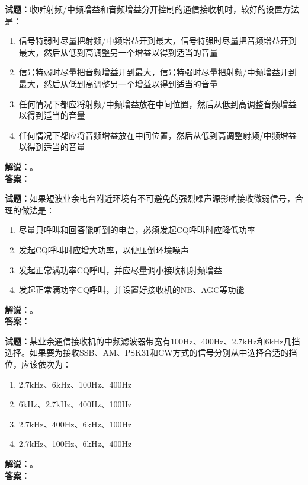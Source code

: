 \documentclass{ctexbook}
\begin{document}
\bigskip

\noindent\textbf{试题：}收听射频/中频增益和音频增益分开控制的通信接收机时，较好的设置方法是：
\begin{enumerate}[leftmargin=3em]
  \item 信号特弱时尽量把射频/中频增益开到最大，信号特强时尽量把音频增益开到最大，然后从低到高调整另一个增益以得到适当的音量
  \item 信号特弱时尽量把音频增益开到最大，信号特强时尽量把射频/中频增益开到最大，然后从低到高调整另一个增益以得到适当的音量
  \item 任何情况下都应将射频/中频增益放在中间位置，然后从低到高调整音频增益以得到适当的音量
  \item 任何情况下都应将音频增益放在中间位置，然后从低到高调整射频/中频增益以得到适当的音量
\end{enumerate}
\noindent\textbf{解说：}\textbf{}。\\\noindent\textbf{答案：}

\bigskip

\noindent\textbf{试题：}如果短波业余电台附近环境有不可避免的强烈噪声源影响接收微弱信号，合理的做法是：
\begin{enumerate}[leftmargin=3em]
  \item 尽量只呼叫和回答能听到的电台，必须发起CQ呼叫时应降低功率
  \item 发起CQ呼叫时应增大功率，以便压倒环境噪声
  \item 发起正常满功率CQ呼叫，并应尽量调小接收机射频增益
  \item 发起正常满功率CQ呼叫，并设置好接收机的NB、AGC等功能
\end{enumerate}
\noindent\textbf{解说：}\textbf{}。\\\noindent\textbf{答案：}

\bigskip

\noindent\textbf{试题：}某业余通信接收机的中频滤波器带宽有100Hz、400Hz、2.7\unit{\kHz}和6\unit{\kHz}几挡选择。如果要为接收SSB、AM、PSK31和CW方式的信号分别从中选择合适的挡位，应该依次为：
\begin{enumerate}[leftmargin=3em]
  \item 2.7\unit{\kHz}、6\unit{\kHz}、100Hz、400Hz
  \item 6\unit{\kHz}、2.7\unit{\kHz}、400Hz、100Hz
  \item 2.7\unit{\kHz}、400Hz、6\unit{\kHz}、100Hz
  \item 2.7\unit{\kHz}、100Hz、6\unit{\kHz}、400Hz
\end{enumerate}
\noindent\textbf{解说：}\textbf{}。\\\noindent\textbf{答案：}
\end{document}

